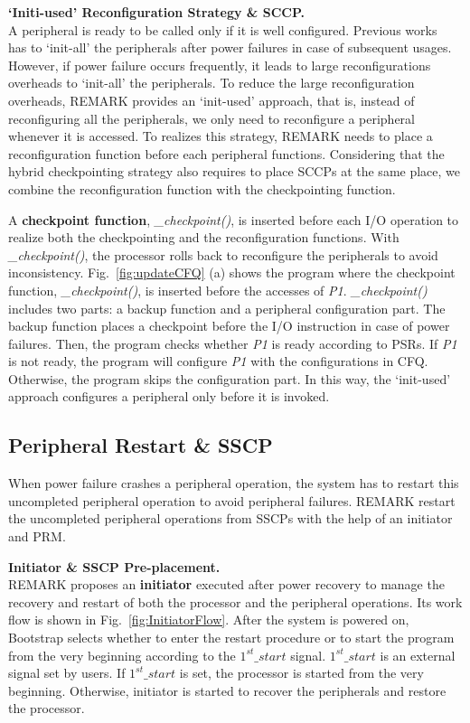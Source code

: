\noindent\textbf{`Initi-used' Reconfiguration Strategy \& SCCP.} \\
%
A peripheral is ready to be called only if it is well configured.
Previous works~\cite{jayakumar2014quickrecall,li2016hw} has to `init-all' the peripherals after power failures in case of subsequent usages. 
However, if power failure occurs frequently, it leads to large reconfigurations overheads to `init-all' the peripherals.
To reduce the large reconfiguration overheads, REMARK provides an `init-used' approach, that is, instead of reconfiguring all the peripherals, we only need to reconfigure a peripheral whenever it is accessed. 
To realizes this strategy, REMARK needs to place a reconfiguration function before each peripheral functions.
Considering that the hybrid checkpointing strategy also requires to place SCCPs at the same place, we combine the reconfiguration function with the checkpointing function.

%
A \textbf{checkpoint function}, \emph{\_checkpoint()}, is inserted before each I/O operation to realize both the checkpointing and the reconfiguration functions.
With \emph{\_checkpoint()}, the processor rolls back to reconfigure the peripherals to avoid inconsistency.
Fig.~\ref{fig:updateCFQ} (a) shows the program where the checkpoint function, \emph{\_checkpoint()}, is inserted before the accesses of \emph{P1}.
\emph{\_checkpoint()} includes two parts: a backup function and a peripheral configuration part.
The backup function places a checkpoint before the I/O instruction in case of power failures.
Then, the program checks whether \emph{P1} is ready according to PSRs.
If \emph{P1} is not ready, the program will configure \emph{P1} with the configurations in CFQ.
Otherwise, the program skips the configuration part.
In this way, the `init-used' approach configures a peripheral only before it is invoked.


\subsection{Peripheral Restart \& SSCP}	\label{sec:offlinePeriRes}
%
When power failure crashes a peripheral operation, the system has to restart this uncompleted peripheral operation to avoid peripheral failures.
REMARK restart the uncompleted peripheral operations from SSCPs with the help of an initiator and PRM.

\noindent\textbf{Initiator \& SSCP Pre-placement.} \\
%
REMARK proposes an \textbf{initiator} executed after power recovery to manage the recovery and restart of both the processor and the peripheral operations.
Its work flow is shown in Fig.~\ref{fig:InitiatorFlow}.
After the system is powered on, Bootstrap selects whether to enter the restart procedure or to start the program from the very beginning according to the \emph{$1^{st}\_start$} signal.
\emph{$1^{st}\_start$} is an external signal set by users.
If \emph{$1^{st}\_start$} is set, the processor is started from the very beginning.
Otherwise, initiator is started to recover the peripherals and restore the processor.

